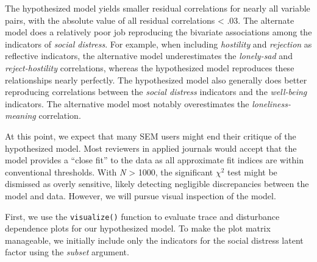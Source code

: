 \documentclass[
  english,
  doc]{apa6}
\begin{document}
The hypothesized model yields smaller residual correlations for nearly all variable pairs, with the absolute value of all residual correlations \textless{} .03. The alternate model does a relatively poor job reproducing the bivariate associations among the indicators of \emph{social distress}. For example, when including \emph{hostility} and \emph{rejection} as reflective indicators, the alternative model underestimates the \emph{lonely-sad} and \emph{reject-hostility} correlations, whereas the hypothesized model reproduces these relationships nearly perfectly. The hypothesized model also generally does better reproducing correlations between the \emph{social distress} indicators and the \emph{well-being} indicators. The alternative model most notably overestimates the \emph{loneliness-meaning} correlation.

At this point, we expect that many SEM users might end their critique of the hypothesized model. Most reviewers in applied journals would accept that the model provides a ``close fit'' to the data as all approximate fit indices are within conventional thresholds. With \emph{N} \textgreater{} 1000, the significant \(\chi^2\) test might be dismissed as overly sensitive, likely detecting negligible discrepancies between the model and data. However, we will pursue visual inspection of the model.

First, we use the \texttt{visualize()} function to evaluate trace and disturbance dependence plots for our hypothesized model. To make the plot matrix manageable, we initially include only the indicators for the social distress latent factor using the \emph{subset} argument.
\end{document}
